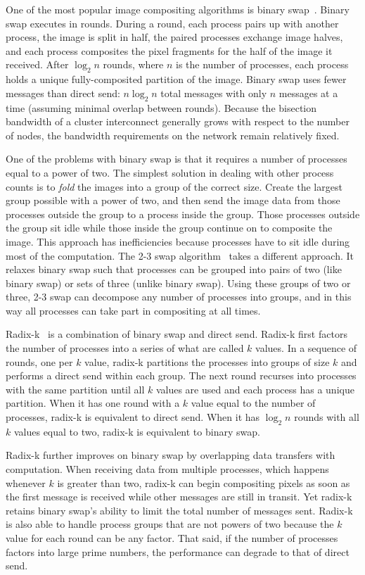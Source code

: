 \documentclass{acm_proc_article-sp}
\newcommand*{\lcite}[1]{~\cite{#1}}
\newcommand*{\keyterm}[1]{\emph{#1}}
\begin{document}
One of the most popular image compositing algorithms is binary
swap\lcite{BinarySwap1,BinarySwap2}.  Binary swap executes in rounds.
During a round, each process pairs up with another process, the image is
split in half, the paired processes exchange image halves, and each process
composites the pixel fragments for the half of the image it received.
After $\log_{2} n$ rounds, where $n$ is the number of processes, each
process holds a unique fully-composited partition of the image.  Binary
swap uses fewer messages than direct send: $n \log_{2} n$ total messages
with only $n$ messages at a time (assuming minimal overlap between
rounds).  Because the bisection bandwidth of a cluster interconnect
generally grows with respect to the number of nodes, the bandwidth
requirements on the network remain relatively fixed.

One of the problems with binary swap is that it requires a number of
processes equal to a power of two.  The simplest solution in dealing with
other process counts is to \keyterm{fold} the images into a group of the
correct size.  Create the largest group possible with a power of two, and
then send the image data from those processes outside the group to a
process inside the group.  Those processes outside the group sit idle while
those inside the group continue on to composite the image.  This approach
has inefficiencies because processes have to sit idle during most of the
computation.  The 2-3 swap algorithm\lcite{23Swap} takes a different
approach.  It relaxes binary swap such that processes can be grouped into
pairs of two (like binary swap) or sets of three (unlike binary swap).
Using these groups of two or three, 2-3 swap can decompose any number of
processes into groups, and in this way all processes can take part in
compositing at all times.

Radix-k\lcite{RadixK} is a combination of binary swap and direct send.
Radix-k first factors the number of processes into a series of what are
called $k$ values.  In a sequence of rounds, one per $k$ value, radix-k
partitions the processes into groups of size $k$ and performs a direct send
within each group.  The next round recurses into processes with the same
partition until all $k$ values are used and each process has a unique
partition.  When it has one round with a $k$ value equal to the number of
processes, radix-k is equivalent to direct send.  When it has $\log_{2} n$
rounds with all $k$ values equal to two, radix-k is equivalent to binary
swap.

Radix-k further improves on binary swap by overlapping data transfers with
computation.  When receiving data from multiple processes, which happens
whenever $k$ is greater than two, radix-k can begin compositing pixels as
soon as the first message is received while other messages are still in
transit.  Yet radix-k retains binary swap's ability to limit the total
number of messages sent.  Radix-k is also able to handle process groups
that are not powers of two because the $k$ value for each round can be any
factor.  That said, if the number of processes factors into large prime
numbers, the performance can degrade to that of direct send.
\end{document}
